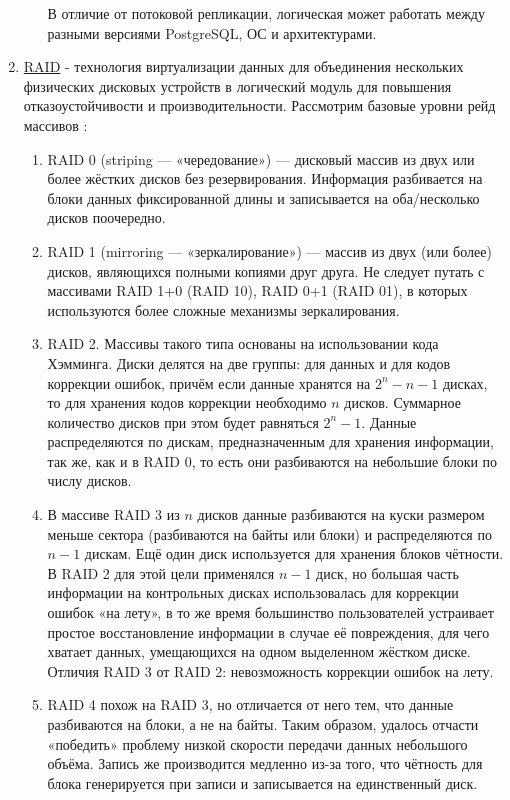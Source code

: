 \begin{enumerate}
\begin{itemize}
В отличие от потоковой репликации, логическая может работать между разными версиями PostgreSQL, ОС и архитектурами.
	\end{itemize}
     \item \underline{RAID} - технология виртуализации данных для объединения нескольких физических дисковых устройств в логический модуль для повышения отказоустойчивости и производительности.
     Рассмотрим базовые уровни рейд массивов \autocite{Patterson}:
     \begin{enumerate}
         \item RAID 0 (striping — «чередование») — дисковый массив из двух или более жёстких дисков без резервирования. Информация разбивается на блоки данных фиксированной длины и записывается на оба/несколько дисков поочередно.
         \item RAID 1 (mirroring — «зеркалирование») — массив из двух (или более) дисков, являющихся полными копиями друг друга. Не следует путать с массивами RAID 1+0 (RAID 10), RAID 0+1 (RAID 01), в которых используются более сложные механизмы зеркалирования.
         \item RAID 2. Массивы такого типа основаны на использовании кода Хэмминга. Диски делятся на две группы: для данных и для кодов коррекции ошибок, причём если данные хранятся на $2 ^ n - n - 1$ дисках, то для хранения кодов коррекции необходимо $n$ дисков. Суммарное количество дисков при этом будет равняться $2 ^ n - 1$. Данные распределяются по дискам, предназначенным для хранения информации, так же, как и в RAID 0, то есть они разбиваются на небольшие блоки по числу дисков.
         \item В массиве RAID 3 из $n$ дисков данные разбиваются на куски размером меньше сектора (разбиваются на байты или блоки) и распределяются по $n - 1$ дискам. Ещё один диск используется для хранения блоков чётности. В RAID 2 для этой цели применялся $n - 1$ диск, но большая часть информации на контрольных дисках использовалась для коррекции ошибок «на лету», в то же время большинство пользователей устраивает простое восстановление информации в случае её повреждения, для чего хватает данных, умещающихся на одном выделенном жёстком диске. \\ Отличия RAID 3 от RAID 2: невозможность коррекции ошибок на лету.
         \item RAID 4 похож на RAID 3, но отличается от него тем, что данные разбиваются на блоки, а не на байты. Таким образом, удалось отчасти «победить» проблему низкой скорости передачи данных небольшого объёма. Запись же производится медленно из-за того, что чётность для блока генерируется при записи и записывается на единственный диск.

\end{enumerate}
\end{enumerate}

